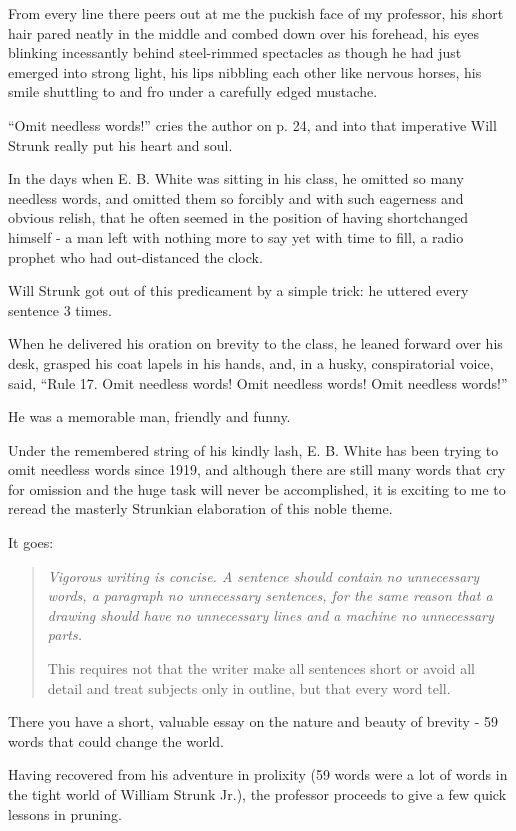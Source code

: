 \documentclass{book}
\numberwithin{equation}{section}
\begin{document}
From every line there peers out at me the puckish face of my professor, his short hair pared neatly in the middle and combed down over his forehead, his eyes blinking incessantly behind steel-rimmed spectacles as though he had just emerged into strong light, his lips nibbling each other like nervous horses, his smile shuttling to and fro under a carefully edged mustache.

%
``Omit needless words!'' cries the author on p. 24, and into that imperative Will Strunk really put his heart and soul.

In the days when E. B. White was sitting in his class, he omitted so many needless words, and omitted them so forcibly and with such eagerness and obvious relish, that he often seemed in the position of having shortchanged himself - a man left with nothing more to say yet with time to fill, a radio prophet who had out-distanced the clock.

Will Strunk got out of this predicament by a simple trick: he uttered every sentence 3 times.

When he delivered his oration on brevity to the class, he leaned forward over his desk, grasped his coat lapels in his hands, and, in a husky, conspiratorial voice, said, ``Rule 17. Omit needless words! Omit needless words! Omit needless words!''

%
He was a memorable man, friendly and funny.

Under the remembered string of his kindly lash, E. B. White has been trying to omit needless words since 1919, and although there are still many words that cry for omission and the huge task will never be accomplished, it is exciting to me to reread the masterly Strunkian elaboration of this noble theme.

It goes:

\begin{quotation}
    \it
    Vigorous writing is concise. A sentence should contain no unnecessary words, a paragraph no unnecessary sentences, for the same reason that a drawing should have no unnecessary lines and a machine no unnecessary parts.
    
    This requires not that the writer make all sentences short or avoid all detail and treat subjects only in outline, but that every word tell.
\end{quotation}
There you have a short, valuable essay on the nature and beauty of brevity - 59 words that could change the world.

Having recovered from his adventure in prolixity (59 words were a lot of words in the tight world of William Strunk Jr.), the professor proceeds to give a few quick lessons in pruning.
\end{document}
